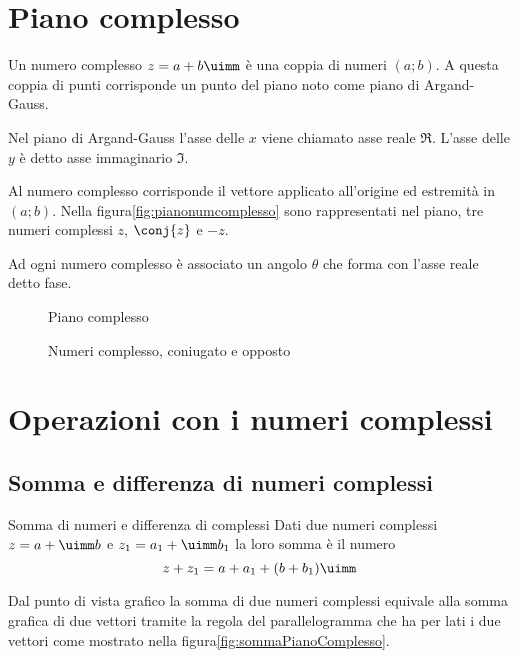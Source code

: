 \section{Piano complesso}
Un numero complesso $z=a+b\uimm$ è una coppia di numeri $(a;b)$. A questa 
coppia di punti corrisponde un punto del piano noto come piano di  
Argand-Gauss.\par  
Nel piano di Argand-Gauss l'asse delle $x$ viene chiamato asse reale $\Re$. 
L'asse delle $y$ è detto asse immaginario $\Im$.\par
Al numero complesso corrisponde il vettore applicato all'origine ed estremità 
in $(a;b)$. Nella figura\nobs\vref{fig:pianonumcomplesso} sono rappresentati nel piano,
tre numeri complessi $z$, $\conj{z}$ e $-z$.\par Ad ogni numero complesso è 
associato un angolo $\theta$ che forma con l'asse reale detto fase. 
\begin{figure}
	\centering
	
	\caption{Piano complesso}
	\label{fig:nuncomplPianoComplesso}
\end{figure}
\begin{figure} %
	\centering

	\caption{Numeri complesso, coniugato e opposto}
	\label{fig:pianonumcomplesso}
\end{figure}

\section{Operazioni con i numeri complessi}
\label{sec:NumCompOperazioni}
\subsection{Somma e differenza di numeri complessi}
\begin{definizionet}{Somma di numeri e differenza di complessi}{}
Dati due numeri complessi  $z=a+\uimm b$ e  $z_1=a_1+\uimm b_1$ la loro somma è il numero \[z+z_1=a+a_1+(b+b_1)\uimm\]
\end{definizionet}
Dal punto di vista grafico la somma di due numeri complessi equivale alla somma grafica di due vettori tramite la regola del parallelogramma che ha per lati i due vettori come mostrato nella figura\nobs\vref{fig:sommaPianoComplesso}.

